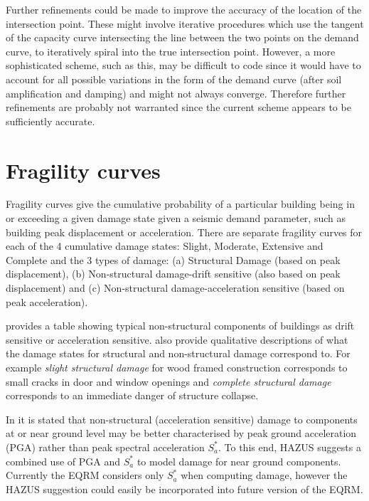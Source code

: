 Further refinements could be made to improve the accuracy of the
location of the intersection point. These might involve iterative
procedures which use the tangent of the capacity
curve intersecting the line between the two
points on the demand curve, to iteratively
spiral into the true intersection point. However, a more
sophisticated scheme, such as this, may be difficult to code since
it would have to account for all possible variations in the form
of the demand curve (after soil amplification
and damping) and might not always converge. Therefore further
refinements are probably not warranted since the current scheme
appears to be sufficiently accurate.






\section{Fragility curves}

Fragility curves give the cumulative probability of a particular
building being in or exceeding a given damage state given  a
seismic demand parameter, such as building peak
displacement or acceleration. There are
separate fragility curves for each of the
4 cumulative damage states: Slight, Moderate, Extensive and
Complete and the 3 types of damage: (a) Structural Damage (based
on peak displacement), (b) Non-structural
damage-drift sensitive (also based on peak displacement) and (c) Non-structural damage-acceleration
sensitive (based on peak acceleration).

\citet[page 5-12, Table 5.2]{dr_FEMA99b} provides a table showing
typical non-structural components of buildings as drift sensitive
or acceleration sensitive. \citet[page 5-13 to 5-23]{dr_FEMA99b}
also provide qualitative descriptions of what the damage states
for structural and non-structural damage correspond to. For
example \textit{slight structural damage} for wood framed
construction corresponds to small cracks in door and window
openings and \textit{complete structural damage} corresponds to an
immediate danger of structure collapse.

In \citet[pages 5-19]{dr_FEMA99b} it is stated that non-structural
(acceleration sensitive) damage to components at or near ground
level may be better characterised by peak ground acceleration
(PGA) rather than peak spectral acceleration $S^*_a$. To this end,
HAZUS suggests a combined use of PGA and $S^*_a$ to model damage
for near ground components. Currently the EQRM considers only
$S^*_a$ when computing damage, however the HAZUS suggestion could
easily be incorporated into future version of the EQRM.


